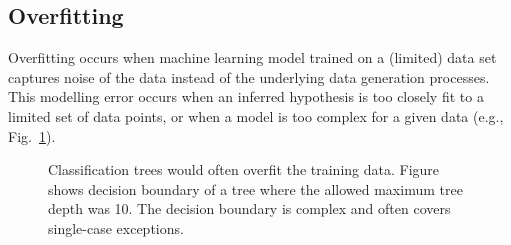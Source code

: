 \begin{refsection}
\subsection*{Overfitting}

Overfitting occurs when machine learning model trained on a (limited) data set captures noise of the data instead of the underlying data generation processes. This modelling error occurs when an inferred hypothesis is too closely fit to a limited set of data points, or when a model is too complex for a given data (e.g., Fig.~\ref{fig:tree-overfit}). 

\begin{figure}[htbp]
\caption{Classification trees would often overfit the training data. Figure shows decision boundary of a tree where the allowed maximum tree depth was 10. The decision boundary is complex and often covers single-case exceptions.}
\label{fig:tree-overfit}
\end{figure}


\end{refsection}
